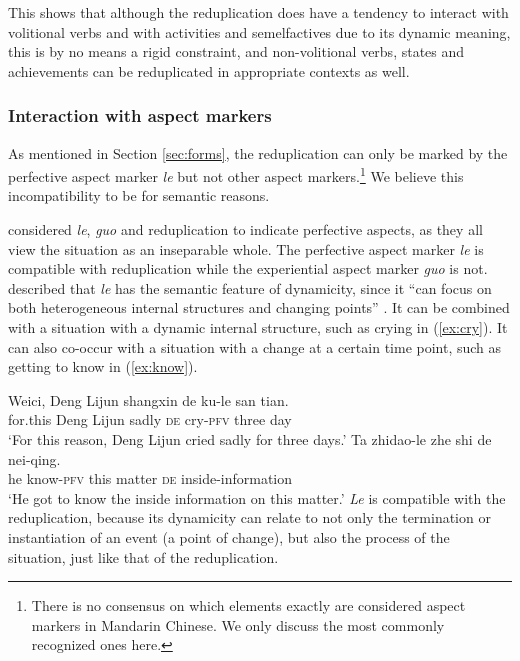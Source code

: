 This shows that although the reduplication does have a tendency to interact with volitional verbs and with activities and semelfactives due to its dynamic meaning, 
this is by no means a rigid constraint, 
and non\hyp{}volitional verbs, states and achievements can be reduplicated in appropriate contexts as well.




\subsubsection{Interaction with aspect markers}\label{sec:aspM}

As mentioned in Section \ref{sec:forms}, the reduplication can only be marked by the perfective aspect marker \textit{le} but not other aspect markers.\footnote{
There is no consensus on which elements exactly are considered aspect markers in Mandarin Chinese. We only discuss the most commonly recognized ones here.
}
We believe this incompatibility to be for semantic reasons.

\citet[Ch. 4]{XiaoMcEnery2004} considered \textit{le}, \textit{guo} and reduplication to indicate perfective aspects, as they all view the situation as an inseparable whole.
The perfective aspect marker \textit{le} is compatible with reduplication while the experiential aspect marker \textit{guo} is not.
\citet[128--131]{XiaoMcEnery2004} described that \textit{le} has the semantic feature of dynamicity, since it ``can focus on both heterogeneous internal structures and changing points'' \citep[129]{XiaoMcEnery2004}.
It can be combined with a situation with a dynamic internal structure, such as crying in (\ref{ex:cry}).
It can also co\hyp{}occur with a situation with a change at a certain time point, such as getting to know in (\ref{ex:know}).

\ea
  \ea\label{ex:cry}
    \gll Weici, Deng Lijun shangxin de ku-le san tian.\\
    for.this Deng Lijun sadly \textsc{de} cry-\textsc{pfv} three day\\ 
    \glt `For this reason, Deng Lijun cried sadly for three days.'
  \ex\label{ex:know}
    \gll Ta zhidao-le zhe shi de nei-qing.\\
    he know-\textsc{pfv} this matter \textsc{de} inside-information\\ 
    \glt `He got to know the inside information on this matter.'
  \z
\z
\textit{Le} is compatible with the reduplication, because its dynamicity can relate to not only the termination or instantiation of an event (a point of change), but also the process of the situation, just like that of the reduplication.

